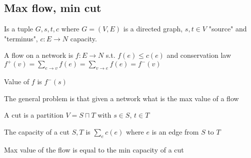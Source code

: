 \subsection{Max flow, min cut}
\begin{definition}[network]
	\label{def:network}
	Is a tuple \(G,s,t,c\) where \(G = (V, E)\) is a directed graph, \(s,t \in V\) "source" and "terminus", \(c: E \to N\) capacity. 
\end{definition}  

\begin{definition}[flow]
	\label{def:flow}
	A flow on a network is \(f: E \to N\) s.t. \(f(e) \leq c(e)\) and conservation law \(f^{+}(v) = \sum_{e \to v} f(e) = \sum_{v \to e} f(e) = f^{-}(v)\) 
\end{definition}

\begin{definition}[value]
	\label{def:value}
	Value of \(f\)  is \(f^{-}(s)\)
\end{definition}  

The general problem is that given a network what is the max value of a flow

\begin{definition}[cut]
	\label{def:cut}
	A cut is a partition \(V = S \sqcap T\) with \(s \in S\), \(t \in T\)
\end{definition}
\begin{definition}[capacity]
	\label{def:capacity}
	The capacity of a cut \(S, T\) is \(\sum_{e} c(e)\) where \(e\) is an edge from \(S\) to \(T\) 
\end{definition}  

\begin{theorem}
	\label{thm:ford-fulkerson}
	Max value of the flow is equal to the min capacity of a cut
\end{theorem} 


